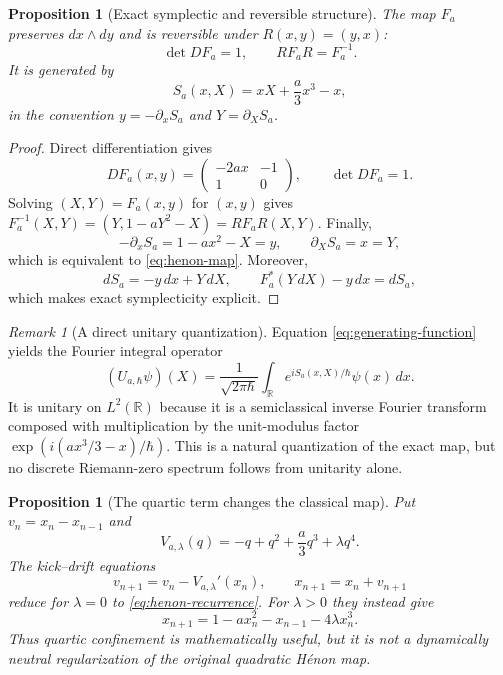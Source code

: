 \documentclass[11pt]{article}
\newtheorem{proposition}[theorem]{Proposition}
\theoremstyle{definition}
\theoremstyle{remark}
\newtheorem{remark}[theorem]{Remark}
\newcommand{\R}{\mathbb R}
\begin{document}
\begin{proposition}[Exact symplectic and reversible structure]\label{prop:henon-structure}
The map $F_a$ preserves $dx\wedge dy$ and is reversible under $R(x,y)=(y,x)$:
\begin{equation}\label{eq:reversibility}
    \det DF_a=1,
    \qquad
    RF_aR=F_a^{-1}.
\end{equation}
It is generated by
\begin{equation}\label{eq:generating-function}
    S_a(x,X)=xX+\frac a3x^3-x,
\end{equation}
in the convention $y=-\partial_xS_a$ and $Y=\partial_XS_a$.
\end{proposition}

\begin{proof}
Direct differentiation gives
\[
    DF_a(x,y)=
    \begin{pmatrix}-2ax&-1\\1&0\end{pmatrix},
    \qquad \det DF_a=1.
\]
Solving $(X,Y)=F_a(x,y)$ for $(x,y)$ gives
$F_a^{-1}(X,Y)=(Y,1-aY^2-X)=RF_aR(X,Y)$.  Finally,
\[
    -\partial_xS_a=1-a x^2-X=y,
    \qquad
    \partial_XS_a=x=Y,
\]
which is equivalent to \eqref{eq:henon-map}.  Moreover,
\[
    dS_a=-y\,dx+Y\,dX,
    \qquad
    F_a^*(Y\,dX)-y\,dx=dS_a,
\]
which makes exact symplecticity explicit.
\end{proof}

\begin{remark}[A direct unitary quantization]\label{rem:fio}
Equation \eqref{eq:generating-function} yields the Fourier integral operator
\begin{equation}\label{eq:fio}
    (U_{a,\hbar}\psi)(X)
    =\frac1{\sqrt{2\pi\hbar}}
      \int_{\R}e^{iS_a(x,X)/\hbar}\psi(x)\,dx.
\end{equation}
It is unitary on $L^2(\R)$ because it is a semiclassical inverse Fourier transform composed with multiplication by the unit-modulus factor
$\exp(i(a x^3/3-x)/\hbar)$.  This is a natural quantization of the exact map, but no discrete Riemann-zero spectrum follows from unitarity alone.
\end{remark}

\begin{proposition}[The quartic term changes the classical map]\label{prop:quartic-changes-map}
Put $v_n=x_n-x_{n-1}$ and
\[
    V_{a,\lambda}(q)=-q+q^2+\frac a3q^3+\lambda q^4.
\]
The kick--drift equations
\[
    v_{n+1}=v_n-V_{a,\lambda}'(x_n),
    \qquad x_{n+1}=x_n+v_{n+1}
\]
reduce for $\lambda=0$ to \eqref{eq:henon-recurrence}.  For $\lambda>0$ they instead give
\begin{equation}\label{eq:modified-henon}
    x_{n+1}=1-a x_n^2-x_{n-1}-4\lambda x_n^3.
\end{equation}
Thus quartic confinement is mathematically useful, but it is not a dynamically neutral regularization of the original quadratic H\'{e}non map.
\end{proposition}
\end{document}
